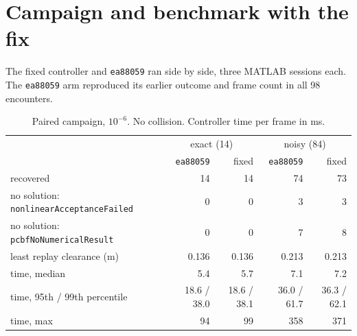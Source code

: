 \documentclass[11pt]{article}
\begin{document}
\section{Campaign and benchmark with the fix}
The fixed controller and \texttt{ea88059} ran side by side, three MATLAB
sessions each. The \texttt{ea88059} arm reproduced its earlier outcome and
frame count in all 98 encounters.

\begin{table}[h]
\centering\small
\caption{Paired campaign, $10^{-6}$. No collision. Controller time per frame
in ms.}
\begin{tabular}{lrrrr}
\toprule
 & \multicolumn{2}{c}{exact (14)} & \multicolumn{2}{c}{noisy (84)}\\
 & \texttt{ea88059} & fixed & \texttt{ea88059} & fixed\\
\midrule
recovered & 14 & 14 & 74 & 73\\
no solution: \texttt{nonlinearAcceptanceFailed} & 0 & 0 & 3 & 3\\
no solution: \texttt{pcbfNoNumericalResult} & 0 & 0 & 7 & 8\\
least replay clearance (m) & 0.136 & 0.136 & 0.213 & 0.213\\
time, median & 5.4 & 5.7 & 7.1 & 7.2\\
time, 95th / 99th percentile & 18.6 / 38.0 & 18.6 / 38.1 & 36.0 / 61.7 & 36.3 / 62.1\\
time, max & 94 & 99 & 358 & 371\\
\bottomrule
\end{tabular}
\end{table}
\end{document}

